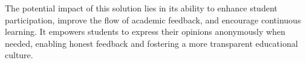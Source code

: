 The potential impact of this solution lies in its ability to enhance student participation, improve the flow of academic feedback, and encourage continuous learning. It empowers students to express their opinions anonymously when needed, enabling honest feedback and fostering a more transparent educational culture.

